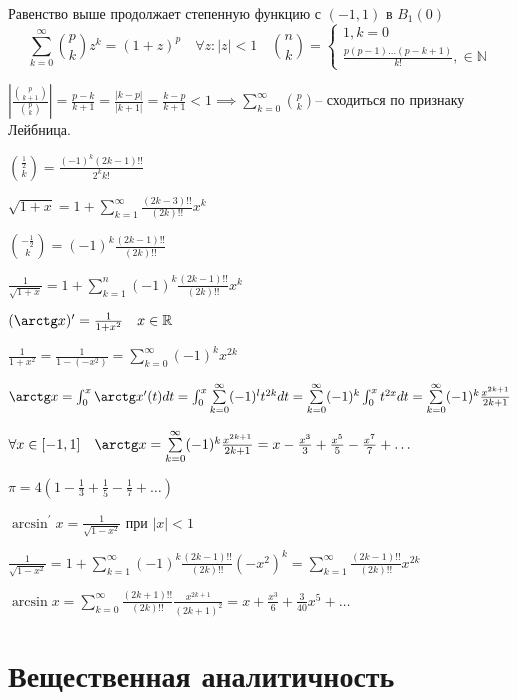\documentclass{book}
\newcommand\N{\ensuremath{\mathbb{N}}}
\newcommand\R{\ensuremath{\mathbb{R}}}
\newcommand{\p}[1]{#1^{\prime}}
\theoremstyle{definition}
\begin{document}
    Равенство выше продолжает степенную функцию с  $(-1,1)$ в  $B_1(0)$ \[\sum_{k=0}^{\infty } {p \choose k} z^k = (1+z)^p\quad \forall z: |z|<1 \quad {n\choose k} = \begin{cases}
        1, k=0\\
        \frac{p\left( p-1 \right) \ldots\left( p-k+1 \right) }{k!}, \in \N 
    \end{cases}\]

    $\left| \frac{{p \choose k+1}}{{p \choose k}} \right| = \frac{p-k}{k+1} = \frac{|k-p|}{|k+1|} = \frac{k-p}{k+1}<1 \implies \sum_{k=0}^{\infty } {p\choose k}$-- сходиться по признаку Лейбница.

    ${\frac{1}{2} \choose k} = \frac{(-1)^k(2k-1)!!}{2^kk!}$ 

    $\sqrt{1+x} = 1 + \sum_{k=1}^{\infty } \frac{(2k-3)!!}{(2k)!!}x^k $ 

    ${-\frac{1}{2}\choose k} = (-1)^k \frac{(2k-1)!!}{(2k)!!}$ 

    $\frac{1}{\sqrt{1+x} } = 1 + \sum_{k=1}^{n} (-1)^k \frac{(2k-1)!!}{(2k)!!}x^k$ 

    $\p {(\arctg x)} = \frac{1}{1+x^2}\quad x\in \R$ 

    $\frac{1}{1+x^2} = \frac{1}{1-(-x^2)} = \sum_{k=0}^{\infty } (-1)^kx^{2k}$ 

    $\arctg x = \int_0^x \p {\arctg x}(t)dt = \int_0^x \sum_{k=0}^{\infty } (-1)^l t^{2k}dt = \sum_{k=0}^{\infty } (-1)^k\int_0^x t^{2x}dt = \sum_{k=0}^{\infty } (-1)^k \frac{x^{2k+1}}{2k+1}$ 

    $\forall x\in [-1,1]\quad \arctg x = \sum_{k=0}^{\infty } (-1)^k \frac{x^{2k+1}}{2k+1} = x - \frac{x^3}{3} + \frac{x^5}{5} - \frac{x^7}{7} + \ldots$ 

    $\pi  = 4\left( 1-\frac{1}{3}+\frac{1}{5}-\frac{1}{7}+\ldots \right) $ 

    $\p {\arcsin} x = \frac{1}{\sqrt{1-x^2} }$ при $|x|<1$

    $\frac{1}{\sqrt{1-x^2} } = 1 + \sum_{k=1}^{\infty } (-1)^k \frac{(2k-1)!!}{(2k)!!}(-x^2)^k = \sum_{k=1}^{\infty } \frac{(2k-1)!!}{(2k)!!}x^{2k}$ 

    $\arcsin x = \sum_{k=0}^{\infty } \frac{(2k+1)!!}{(2k)!!} \frac{x^{2k+1}}{(2k+1)^2} = x + \frac{x^3}{6} + \frac{3}{40}x^5 + \ldots$ 

    \section{Вещественная аналитичность}
\end{document}
